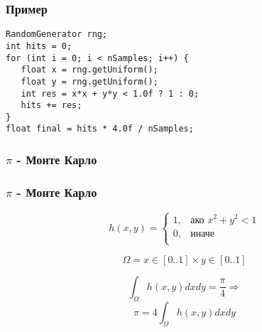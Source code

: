 \begin{frame}[fragile]
\frametitle{Пример}
\pause
\begin{lstlisting}
RandomGenerator rng;
int hits = 0;
for (int i = 0; i < nSamples; i++) {
   float x = rng.getUniform();
   float y = rng.getUniform();
   int res = x*x + y*y < 1.0f ? 1 : 0;
   hits += res;
}
float final = hits * 4.0f / nSamples;
\end{lstlisting}
\end{frame}

\begin{frame}
  \frametitle{$\pi$ - Монте Карло}
  \begin{figure}[t]
  \end{figure}
\end{frame}

\begin{frame}
  \frametitle{$\pi$ - Монте Карло}
  \begin{equation*}
   h(x,y) = \begin{cases}
        1,& \text{ако } x^2 + y^2 < 1 \\
        0,& \text{иначе}\\
        \end{cases}
  \end{equation*}
  \pause

  \begin{equation*}
    \Omega = x \in [0 .. 1] \times y \in [0 .. 1]
  \end{equation*}
  \pause

  \begin{equation*}
   \int_{\Omega} h(x,y) dx dy = \frac{\pi}{4} \Rightarrow 
  \end{equation*}
  \pause
  \begin{equation*}
   \pi = 4 \int_{\Omega} h(x,y) dx dy
  \end{equation*}
\end{frame}

